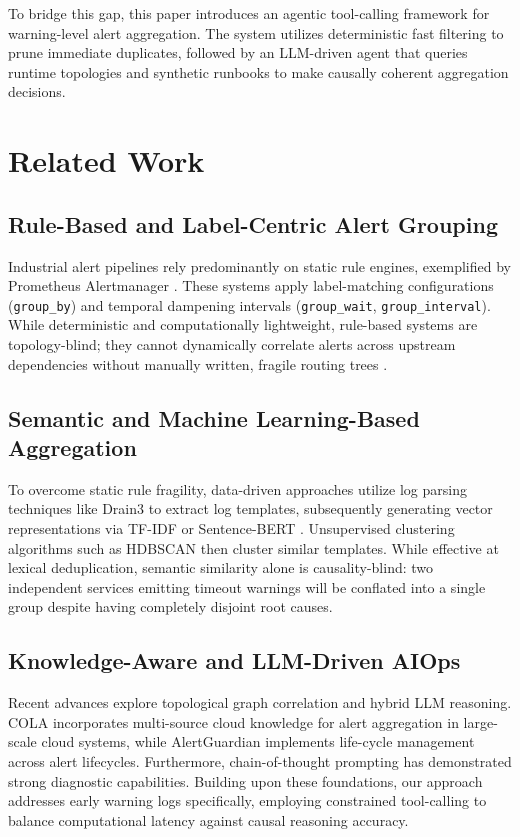 \documentclass[conference]{IEEEtran}
\begin{document}
To bridge this gap, this paper introduces an agentic tool-calling framework for warning-level alert aggregation. The system utilizes deterministic fast filtering to prune immediate duplicates, followed by an LLM-driven agent that queries runtime topologies and synthetic runbooks to make causally coherent aggregation decisions.

\section{Related Work}
\subsection{Rule-Based and Label-Centric Alert Grouping}
Industrial alert pipelines rely predominantly on static rule engines, exemplified by Prometheus Alertmanager \cite{prometheus-alertmanager}. These systems apply label-matching configurations (\texttt{group\_by}) and temporal dampening intervals (\texttt{group\_wait}, \texttt{group\_interval}). While deterministic and computationally lightweight, rule-based systems are topology-blind; they cannot dynamically correlate alerts across upstream dependencies without manually written, fragile routing trees \cite{kuang2024cola}.

\subsection{Semantic and Machine Learning-Based Aggregation}
To overcome static rule fragility, data-driven approaches utilize log parsing techniques like Drain3 \cite{drain3} to extract log templates, subsequently generating vector representations via TF-IDF or Sentence-BERT \cite{sbert}. Unsupervised clustering algorithms such as HDBSCAN \cite{hdbscan} then cluster similar templates. While effective at lexical deduplication, semantic similarity alone is causality-blind: two independent services emitting timeout warnings will be conflated into a single group despite having completely disjoint root causes.

\subsection{Knowledge-Aware and LLM-Driven AIOps}
Recent advances explore topological graph correlation and hybrid LLM reasoning. COLA \cite{kuang2024cola} incorporates multi-source cloud knowledge for alert aggregation in large-scale cloud systems, while AlertGuardian \cite{yu2025alertguardian} implements life-cycle management across alert lifecycles. Furthermore, chain-of-thought prompting \cite{wei2022cot} has demonstrated strong diagnostic capabilities. Building upon these foundations, our approach addresses early warning logs specifically, employing constrained tool-calling to balance computational latency against causal reasoning accuracy.
\end{document}
